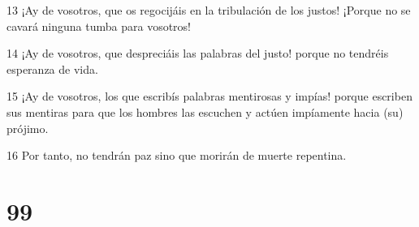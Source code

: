 \par 13 ¡Ay de vosotros, que os regocijáis en la tribulación de los justos! ¡Porque no se cavará ninguna tumba para vosotros!
\par 14 ¡Ay de vosotros, que despreciáis las palabras del justo! porque no tendréis esperanza de vida.
\par 15 ¡Ay de vosotros, los que escribís palabras mentirosas y impías! porque escriben sus mentiras para que los hombres las escuchen y actúen impíamente hacia (su) prójimo.
\par 16 Por tanto, no tendrán paz sino que morirán de muerte repentina.

\chapter{99}

